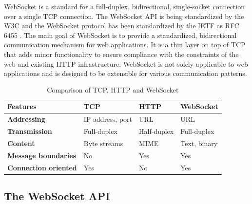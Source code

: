 WebSocket is a standard for a full-duplex, bidirectional, single-socket connection over a single TCP connection. The WebSocket API is being standardized by the W3C and the WebSocket protocol has been standardized by the IETF as RFC 6455 \cite{hickson2011websocket,fette2011websocket}. The main goal of WebSocket is to provide a standardized, bidirectional communication mechanism for web applications. It is a thin layer on top of TCP that adds minor functionality to ensure compliance with the constraints of the web and existing HTTP infrastructure. WebSocket is not solely applicable to web applications and is designed to be extensible for various communication patterns.
\\
\begin{table}[h!]
\centering
\begin{tabular}{llll}
\hline
\textbf{Features}    & \textbf{TCP}        & \textbf{HTTP} & \textbf{WebSocket}       \\ \hline
\textbf{Addressing}           & IP address, port    & URL           & URL                      \\
\textbf{Transmission}         & Full-duplex         & Half-duplex   & Full-duplex              \\
\textbf{Content}              & Byte streams        & MIME			& Text, binary				 \\
\textbf{Message boundaries}   & No                  & Yes           & Yes                       \\
\textbf{Connection oriented}  & Yes                 & No            & Yes						  \\
\hline                         
\end{tabular}
\caption{Comparison of TCP, HTTP and WebSocket \cite{wang2013definitive}}
\label{table:tcpHttpWebsocketComparison}
\end{table}

\subsection{The WebSocket API}

